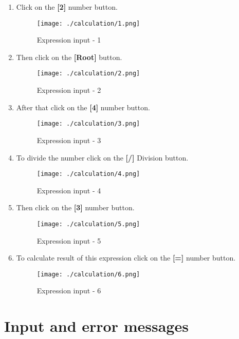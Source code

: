 \documentclass{article}
\begin{document}
\begin{enumerate}
\item Click on the \textbf{[2]} number button.
\begin{figure}[H]
    \centering
    \texttt{[image: ./calculation/1.png]}
    \caption{Expression input - 1}
  \end{figure}
\newpage
\item Then click on the \textbf{[Root]} button.
\begin{figure}[H]
    \centering
    \texttt{[image: ./calculation/2.png]}
    \caption{Expression input - 2}
  \end{figure}

\item After that click on the \textbf{[4]} number button.
\begin{figure}[H]
    \centering
    \texttt{[image: ./calculation/3.png]}
    \caption{Expression input - 3}
  \end{figure}
  
  
\newpage
\item To divide the number click on the \textbf{[/]} Division button.
\begin{figure}[H]
    \centering
    \texttt{[image: ./calculation/4.png]}
    \caption{Expression input - 4}
  \end{figure}


\item Then click on the \textbf{[3]} number button.
\begin{figure}[H]
    \centering
    \texttt{[image: ./calculation/5.png]}
    \caption{Expression input - 5}
  \end{figure}

\newpage
\item To calculate result of this expression click on the \textbf{[=]} number button.
\begin{figure}[H]
    \centering
    \texttt{[image: ./calculation/6.png]}
    \caption{Expression input - 6}
  \end{figure}


\end{enumerate}

\section{Input and error messages}
\end{document}
